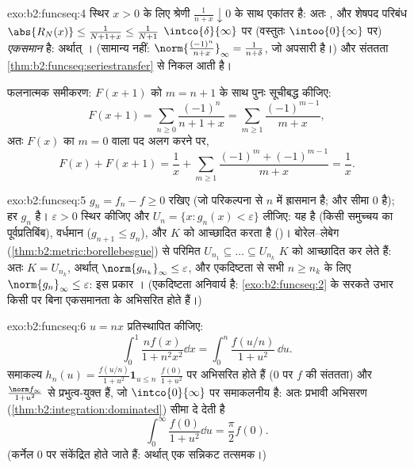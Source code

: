 \begin{solution}{exo:b2:funcseq:4}
स्थिर $x > 0$ के लिए श्रेणी $\frac{1}{n + x}
\downarrow 0$ के साथ एकांतर है: अतः , और
शेषपद परिबंध $\abs{R_N(x)} \leq \frac{1}{N + 1 + x} \leq \frac{1}{N+1}$ $\intco{\delta}{\infty}$ पर (वस्तुतः $\intoo{0}{\infty}$ पर) \emph{एकसमान} है: अर्थात्
। (सामान्य नहीं: $\norm{\frac{(-1)^n}{n+x}}_\infty = \frac{1}{n + \delta}$, जो अपसारी है।) और संततता \cref{thm:b2:funcseq:seriestransfer} से निकल
आती है।

फलनात्मक समीकरण: $F(x + 1)$ को $m = n + 1$ के साथ पुनः सूचीबद्ध कीजिए:
\[
F(x+1) = \sum_{n\geq0} \frac{(-1)^n}{n + 1 + x}
= \sum_{m\geq1}\frac{(-1)^{m-1}}{m+x} ,
\]
अतः $F(x)$ का $m = 0$ वाला पद अलग करने पर,
\[
F(x) + F(x+1)
= \frac{1}{x} + \sum_{m\geq1}
\frac{(-1)^m + (-1)^{m-1}}{m+x} = \frac1x .
\]
\end{solution}

\begin{solution}{exo:b2:funcseq:5}
$g_n = f_n - f \geq 0$ रखिए (जो परिकल्पना से $n$ में ह्रासमान है; और सीमा  $0$ है);
हर $g_n$  है। $\varepsilon
> 0$ स्थिर कीजिए और $U_n = \{x : g_n(x) < \varepsilon\}$ लीजिए: यह  है (किसी 
समुच्चय का पूर्वप्रतिबिंब), वर्धमान ($g_{n+1} \leq g_n$), और $K$ को आच्छादित करता है
()। बोरेल--लेबेग (\cref{thm:b2:metric:borellebesgue}) से परिमित $U_{n_1}
\subseteq \dots \subseteq U_{n_k}$ $K$ को आच्छादित कर
लेते हैं: अतः $K = U_{n_k}$, अर्थात् $\norm{g_{n_k}}_\infty \leq \varepsilon$, और एकदिष्टता से सभी $n \geq n_k$ के लिए $\norm{g_n}_\infty \leq \varepsilon$:
इस प्रकार । (एकदिष्टता अनिवार्य है: \cref{exo:b2:funcseq:2} के सरकते उभार किसी
 पर बिना एकसमानता के  अभिसरित होते हैं।)
\end{solution}

\begin{solution}{exo:b2:funcseq:6}
$u = nx$ प्रतिस्थापित कीजिए:
\[
\int_0^1 \frac{n f(x)}{1 + n^2x^2}\dd x
= \int_0^n \frac{f(u/n)}{1 + u^2}\,\dd u .
\]
समाकल्य $h_n(u) = \frac{f(u/n)}{1+u^2}\mathbf{1}_{u \leq n}$  $\frac{f(0)}{1+u^2}$ पर अभिसरित होते हैं ($0$ पर $f$ की संततता) और
$\frac{\norm f_\infty}{1 + u^2}$ से प्रभुत्व-युक्त हैं, जो $\intco{0}{\infty}$ पर समाकलनीय है: अतः प्रभावी अभिसरण
(\cref{thm:b2:integration:dominated}) सीमा दे देती है
\[
\int_0^\infty \frac{f(0)}{1 + u^2}\dd u = \frac{\pi}{2} f(0) .
\]
(कर्नेल $0$ पर संकेंद्रित होते जाते हैं: अर्थात् एक सन्निकट तत्समक।)
\end{solution}

